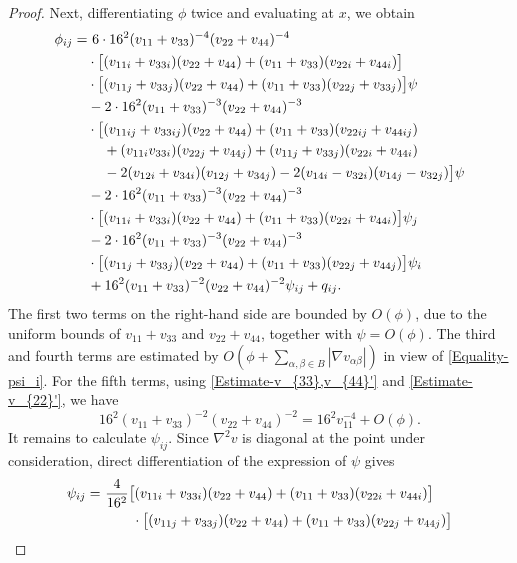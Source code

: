 \documentclass[11pt]{amsart}
\numberwithin{theorem}{section}
\numberwithin{equation}{section}
\begin{document}
\begin{proof}
Next, differentiating $\phi$ twice and evaluating at $x$, we obtain
\begin{align*}
\phi_{ij}
=&~6\cdot16^2(v_{11}+v_{33})^{-4}(v_{22}+v_{44})^{-4}\\
&\cdot\big[(v_{11i}+v_{33i})(v_{22}+v_{44})+(v_{11}+v_{33})(v_{22i}+v_{44i})\big]\\
&\cdot\big[(v_{11j}+v_{33j})(v_{22}+v_{44})+(v_{11}+v_{33})(v_{22j}+v_{33j})\big]\psi\\
&-2\cdot16^2(v_{11}+v_{33})^{-3}(v_{22}+v_{44})^{-3}\\
&\cdot\big[(v_{11ij}+v_{33ij})(v_{22}+v_{44})+(v_{11}+v_{33})(v_{22ij}+v_{44ij})\\
&\hspace{0.4cm}+(v_{11i}v_{33i})(v_{22j}+v_{44j})+(v_{11j}+v_{33j})(v_{22i}+v_{44i})\\
&\hspace{0.4cm}-2(v_{12i}+v_{34i})(v_{12j}+v_{34j})-2(v_{14i}-v_{32i})(v_{14j}-v_{32j})\big]\psi\\
&-2\cdot16^2(v_{11}+v_{33})^{-3}(v_{22}+v_{44})^{-3}\\
&\cdot\big[(v_{11i}+v_{33i})(v_{22}+v_{44})+(v_{11}+v_{33})(v_{22i}+v_{44i})\big]\psi_j\\
&-2\cdot16^2(v_{11}+v_{33})^{-3}(v_{22}+v_{44})^{-3}\\
&\cdot\big[(v_{11j}+v_{33j})(v_{22}+v_{44})+(v_{11}+v_{33})(v_{22j}+v_{44j})\big]\psi_i\\
&+16^2(v_{11}+v_{33})^{-2}(v_{22}+v_{44})^{-2}\psi_{ij}+q_{ij}.
\end{align*}
The first two terms on the right-hand side are bounded by $O(\phi)$, due to the uniform bounds of $v_{11}+v_{33}$ and $v_{22}+v_{44}$, together with $\psi=O(\phi)$. The third and fourth terms are estimated by $O(\phi+\sum_{\alpha,\beta\in B}|\nabla v_{\alpha\beta}|)$ in view of \eqref{Equality-psi_i}. For the fifth terms, using \eqref{Estimate-v_{33},v_{44}'} and \eqref{Estimate-v_{22}'}, we have $$16^2(v_{11}+v_{33})^{-2}(v_{22}+v_{44})^{-2}=16^2v_{11}^{-4}+O(\phi).$$ It remains to calculate $\psi_{ij}$. Since $\nabla^2v$ is diagonal at the point under consideration, direct differentiation of the expression of $\psi$ gives
\begin{align*}
\psi_{ij}
=&~\frac{4}{16^2}\big[(v_{11i}+v_{33i})(v_{22}+v_{44})+(v_{11}+v_{33})(v_{22i}+v_{44i})\big]\\
&\hspace{0.8cm}\cdot\big[(v_{11j}+v_{33j})(v_{22}+v_{44})+(v_{11}+v_{33})(v_{22j}+v_{44j})\big]\\

\end{align*}
\end{proof}
\end{document}
